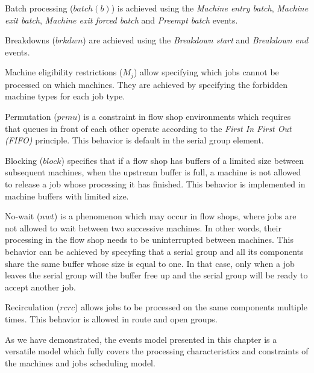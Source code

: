Batch processing ($batch(b)$) is achieved using the \textit{Machine entry batch}, \textit{Machine exit batch}, \textit{Machine exit forced batch} and \textit{Preempt batch} events.

Breakdowns ($brkdwn$) are achieved using the \textit{Breakdown start} and \textit{Breakdown end} events.

Machine eligibility restrictions ($M_j$) allow specifying which jobs cannot be processed on which machines. They are achieved by specifying the forbidden machine types for each job type.

Permutation ($prmu$) is a constraint in flow shop environments which requires that queues in front of each other operate according to the \textit{First In First Out (FIFO)} principle. This behavior is default in the serial group element.

Blocking ($block$) specifies that if a flow shop has buffers of a limited size between subsequent machines, when the upstream buffer is full, a machine is not allowed to release a job whose processing it has finished. This behavior is implemented in machine buffers with limited size.

No-wait ($nwt$) is a phenomenon which may occur in flow shops, where jobs are not allowed to wait between two successive machines. In other words, their processing in the flow shop needs to be uninterrupted between machines. This behavior can be achieved by specyfing that a serial group and all its components share the same buffer whose size is equal to one. In that case, only when a job leaves the serial group will the buffer free up and the serial group will be ready to accept another job.

Recirculation ($rcrc$) allows jobs to be processed on the same components multiple times. This behavior is allowed in route and open groups.

As we have demonstrated, the events model presented in this chapter is a versatile model which fully covers the processing characteristics and constraints of the machines and jobs scheduling model.